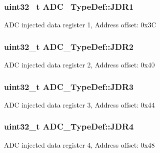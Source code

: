 \subsubsection[{\texorpdfstring{J\+D\+R1}{JDR1}}]{ uint32\+\_\+t A\+D\+C\+\_\+\+Type\+Def\+::\+J\+D\+R1}\hypertarget{struct_a_d_c___type_def_ab4b0a79a9e4a9d5b0a24d7285cf55bdc}{}\label{struct_a_d_c___type_def_ab4b0a79a9e4a9d5b0a24d7285cf55bdc}
A\+DC injected data register 1, Address offset\+: 0x3C 
\subsubsection[{\texorpdfstring{J\+D\+R2}{JDR2}}]{ uint32\+\_\+t A\+D\+C\+\_\+\+Type\+Def\+::\+J\+D\+R2}\hypertarget{struct_a_d_c___type_def_a898b87cab4f099bcca981cc4c9318b51}{}\label{struct_a_d_c___type_def_a898b87cab4f099bcca981cc4c9318b51}
A\+DC injected data register 2, Address offset\+: 0x40 
\subsubsection[{\texorpdfstring{J\+D\+R3}{JDR3}}]{ uint32\+\_\+t A\+D\+C\+\_\+\+Type\+Def\+::\+J\+D\+R3}\hypertarget{struct_a_d_c___type_def_a40999cd0a255ef62b2340e2726695063}{}\label{struct_a_d_c___type_def_a40999cd0a255ef62b2340e2726695063}
A\+DC injected data register 3, Address offset\+: 0x44 
\subsubsection[{\texorpdfstring{J\+D\+R4}{JDR4}}]{ uint32\+\_\+t A\+D\+C\+\_\+\+Type\+Def\+::\+J\+D\+R4}\hypertarget{struct_a_d_c___type_def_abae6e9d688b16ef350878998f5e21c0b}{}\label{struct_a_d_c___type_def_abae6e9d688b16ef350878998f5e21c0b}
A\+DC injected data register 4, Address offset\+: 0x48 

